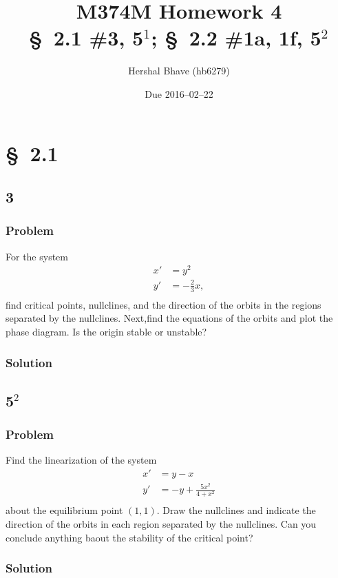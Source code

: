 \documentclass[12pt]{article}
\title{M374M Homework 4 \\
  \normalsize{\S~2.1 \#3, 5$^1$; \S~2.2 \#1a, 1f, 5$^2$}}
\author{Hershal Bhave (hb6279)}
\date{Due 2016--02--22}
\begin{document}
\maketitle
\section{\S~2.1}
\subsection{3}
\subsubsection*{Problem}
For the system
\begin{equation}
  \begin{aligned}
    x'&=y^2 \\
    y'&=-\frac{2}{3}x, \\
  \end{aligned}
\end{equation}
find critical points, nullclines, and the direction of the orbits in the regions
separated by the nullclines. Next,find the equations of the orbits and plot the
phase diagram. Is the origin stable or unstable?
\subsubsection*{Solution}
\todo[]

\subsection{5$^2$}
\subsubsection*{Problem}
Find the linearization of the system
\begin{equation}
  \begin{aligned}
    x'&=y-x \\
    y'&=-y+\frac{5x^2}{4+x^2} \\
  \end{aligned}
\end{equation}
about the equilibrium point $(1,1)$. Draw the nullclines and indicate the
direction of the orbits in each region separated by the nullclines. Can you
conclude anything baout the stability of the critical point?
\subsubsection*{Solution}
\todo[]
\end{document}
